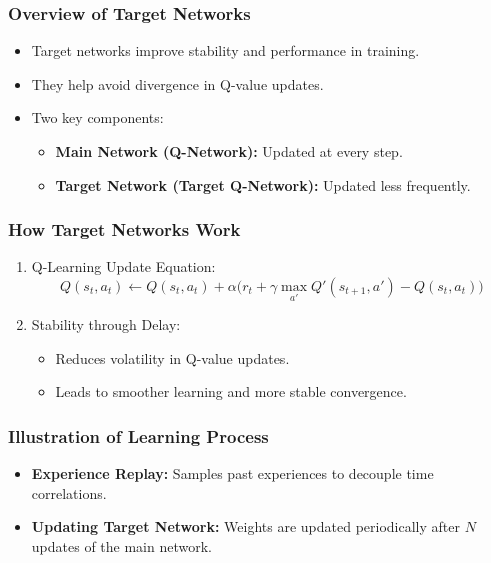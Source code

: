\documentclass[aspectratio=169]{beamer}
\begin{document}
\begin{frame}[fragile]
    \frametitle{Overview of Target Networks}
    \begin{itemize}
        \item Target networks improve stability and performance in training.
        \item They help avoid divergence in Q-value updates.
        \item Two key components:
        \begin{itemize}
            \item \textbf{Main Network (Q-Network):} Updated at every step.
            \item \textbf{Target Network (Target Q-Network):} Updated less frequently.
        \end{itemize}
    \end{itemize}
\end{frame}

\begin{frame}[fragile]
    \frametitle{How Target Networks Work}
    \begin{enumerate}
        \item Q-Learning Update Equation:
        \begin{equation}
            Q(s_t, a_t) \leftarrow Q(s_t, a_t) + \alpha \bigg( r_t + \gamma \max_{a'} Q'(s_{t+1}, a') - Q(s_t, a_t) \bigg)
        \end{equation}
        \item Stability through Delay:
        \begin{itemize}
            \item Reduces volatility in Q-value updates.
            \item Leads to smoother learning and more stable convergence.
        \end{itemize}
    \end{enumerate}
\end{frame}

\begin{frame}[fragile]
    \frametitle{Illustration of Learning Process}
    \begin{itemize}
        \item \textbf{Experience Replay:} Samples past experiences to decouple time correlations.
        \item \textbf{Updating Target Network:} Weights are updated periodically after \(N\) updates of the main network.
    \end{itemize}
\end{frame}
\end{document}
